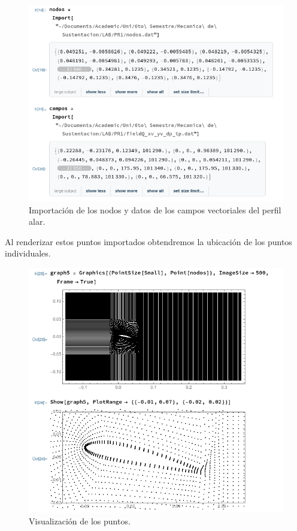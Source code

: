 \documentclass[12pt, letterpaper]{article}
\begin{document}
\begin{figure}[H]
	\centering
	\includegraphics[width=\textwidth]{7.png}
	\caption{Importación de los nodos y datos de los campos vectoriales del perfil alar.}
\end{figure}

Al renderizar estos puntos importados obtendremos la ubicación de los puntos individuales.

\begin{figure}[H]
	\centering
	\includegraphics[width=\textwidth]{8.png}
	\caption{Visualización de los puntos.}
\end{figure}
\end{document}
